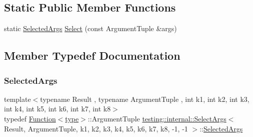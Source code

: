 \subsection*{Static Public Member Functions}
\begin{DoxyCompactItemize}
\item 
static \hyperlink{classtesting_1_1internal_1_1_select_args_3_01_result_00_01_argument_tuple_00_01k1_00_01k2_00_01ke29a32f440a8fcb098d8685a265f9f40_a964de7fbb2ffb6acf0d7d80528cda6ba}{Selected\+Args} \hyperlink{classtesting_1_1internal_1_1_select_args_3_01_result_00_01_argument_tuple_00_01k1_00_01k2_00_01ke29a32f440a8fcb098d8685a265f9f40_a3f3b801b32c8cb88c31bc39cf0e25bb7}{Select} (const Argument\+Tuple \&args)
\end{DoxyCompactItemize}


\subsection{Member Typedef Documentation}
\mbox{\label{classtesting_1_1internal_1_1_select_args_3_01_result_00_01_argument_tuple_00_01k1_00_01k2_00_01ke29a32f440a8fcb098d8685a265f9f40_a964de7fbb2ffb6acf0d7d80528cda6ba}} 
\subsubsection{\texorpdfstring{Selected\+Args}{SelectedArgs}}
{\footnotesize\ttfamily template$<$typename Result , typename Argument\+Tuple , int k1, int k2, int k3, int k4, int k5, int k6, int k7, int k8$>$ \\
typedef \hyperlink{structtesting_1_1internal_1_1_function}{Function}$<$\hyperlink{classtesting_1_1internal_1_1_select_args_3_01_result_00_01_argument_tuple_00_01k1_00_01k2_00_01ke29a32f440a8fcb098d8685a265f9f40_a098037b4b2ed4c33121d2e0f1967acbf}{type}$>$\+::Argument\+Tuple \hyperlink{classtesting_1_1internal_1_1_select_args}{testing\+::internal\+::\+Select\+Args}$<$ Result, Argument\+Tuple, k1, k2, k3, k4, k5, k6, k7, k8, -\/1, -\/1 $>$\+::\hyperlink{classtesting_1_1internal_1_1_select_args_3_01_result_00_01_argument_tuple_00_01k1_00_01k2_00_01ke29a32f440a8fcb098d8685a265f9f40_a964de7fbb2ffb6acf0d7d80528cda6ba}{Selected\+Args}}

